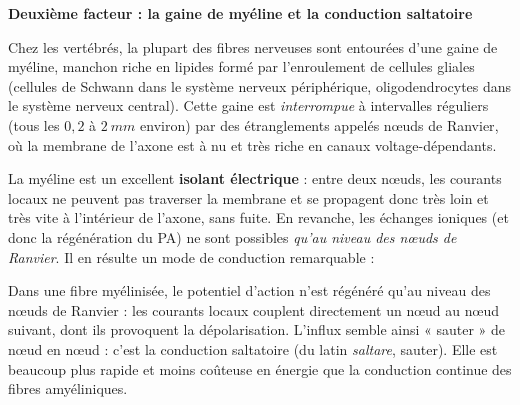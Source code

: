 \documentclass[11pt]{article}
\newcommand{\cle}[1]{{\popxbold\color{popdark}#1}}
\begin{document}
\textbf{Deuxième facteur : la gaine de myéline et la conduction saltatoire}\par

Chez les vertébrés, la plupart des fibres nerveuses sont entourées d'une \cle{gaine de myéline}, manchon riche en lipides formé par l'enroulement de cellules gliales (cellules de Schwann dans le système nerveux périphérique, oligodendrocytes dans le système nerveux central). Cette gaine est \emph{interrompue} à intervalles réguliers (tous les $0,2$ à $\SI{2}{mm}$ environ) par des étranglements appelés \cle{nœuds de Ranvier}, où la membrane de l'axone est à nu et très riche en canaux  voltage-dépendants.

La myéline est un excellent \textbf{isolant électrique} : entre deux nœuds, les courants locaux ne peuvent pas traverser la membrane et se propagent donc très loin et très vite à l'intérieur de l'axone, sans fuite. En revanche, les échanges ioniques (et donc la régénération du PA) ne sont possibles \emph{qu'au niveau des nœuds de Ranvier}. Il en résulte un mode de conduction remarquable :

\begin{propriete}
Dans une fibre myélinisée, le potentiel d'action n'est régénéré qu'au niveau des \cle{nœuds de Ranvier} : les courants locaux couplent directement un nœud au nœud suivant, dont ils provoquent la dépolarisation. L'influx semble ainsi « sauter » de nœud en nœud : c'est la \cle{conduction saltatoire} (du latin \emph{saltare}, sauter). Elle est beaucoup plus rapide et moins coûteuse en énergie que la conduction continue des fibres amyéliniques.
\end{propriete}
\end{document}
